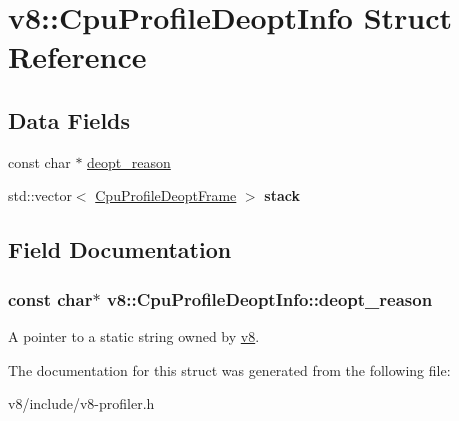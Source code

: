 \hypertarget{structv8_1_1CpuProfileDeoptInfo}{}\section{v8\+:\+:Cpu\+Profile\+Deopt\+Info Struct Reference}
\label{structv8_1_1CpuProfileDeoptInfo}
\subsection*{Data Fields}
\begin{DoxyCompactItemize}
\item 
const char $\ast$ \hyperlink{structv8_1_1CpuProfileDeoptInfo_a908eb3ba33b47ace8973eeb2fda96ca9}{deopt\+\_\+reason}
\item 
std\+::vector$<$ \hyperlink{structv8_1_1CpuProfileDeoptFrame}{Cpu\+Profile\+Deopt\+Frame} $>$ {\bfseries stack}\hypertarget{structv8_1_1CpuProfileDeoptInfo_a9446493c0e0a00e3ada02ba8df858d42}{}\label{structv8_1_1CpuProfileDeoptInfo_a9446493c0e0a00e3ada02ba8df858d42}

\end{DoxyCompactItemize}


\subsection{Field Documentation}
\subsubsection[{\texorpdfstring{deopt\+\_\+reason}{deopt_reason}}]{\setlength{\rightskip}{0pt plus 5cm}const char$\ast$ v8\+::\+Cpu\+Profile\+Deopt\+Info\+::deopt\+\_\+reason}\hypertarget{structv8_1_1CpuProfileDeoptInfo_a908eb3ba33b47ace8973eeb2fda96ca9}{}\label{structv8_1_1CpuProfileDeoptInfo_a908eb3ba33b47ace8973eeb2fda96ca9}
A pointer to a static string owned by \hyperlink{namespacev8}{v8}. 

The documentation for this struct was generated from the following file\+:\begin{DoxyCompactItemize}
\item 
v8/include/v8-\/profiler.\+h\end{DoxyCompactItemize}
